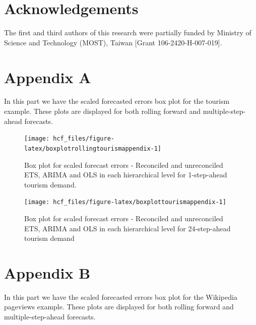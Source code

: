 \documentclass[11pt,a4paper,]{article}
\begin{document}
\hypertarget{acknowledgements}{%
\section*{Acknowledgements}\label{acknowledgements}}

The first and third authors of this research were partially funded by
Ministry of Science and Technology (MOST), Taiwan {[}Grant
106-2420-H-007-019{]}.

\hypertarget{appendixA}{%
\section*{Appendix A}\label{appendixA}}

In this part we have the scaled forecasted errors box plot for the
tourism example. These plots are displayed for both rolling forward and
multiple-step-ahead forecasts.

\begin{figure}

{\centering \texttt{[image: hcf\_files/figure-latex/boxplotrollingtourismappendix-1]} 

}

\caption{Box plot for scaled forecast errors - Reconciled and unreconciled ETS, ARIMA and OLS in each hierarchical level for 1-step-ahead tourism demand.}\label{fig:boxplotrollingtourismappendix}
\end{figure}

\begin{figure}

{\centering \texttt{[image: hcf\_files/figure-latex/boxplottourismappendix-1]} 

}

\caption{Box plot for scaled forecast errors - Reconciled and unreconciled ETS, ARIMA and OLS in each hierarchical level for 24-step-ahead tourism demand}\label{fig:boxplottourismappendix}
\end{figure}

\hypertarget{appendixB}{%
\section*{Appendix B}\label{appendixB}}

In this part we have the scaled forecasted errors box plot for the
Wikipedia pageviews example. These plots are displayed for both rolling
forward and multiple-step-ahead forecasts.
\end{document}
